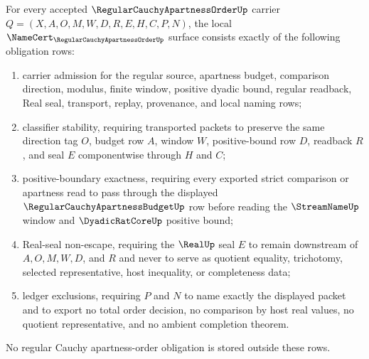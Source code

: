 \begin{theorem}
\label{thm:regular-cauchy-apartness-order-namecert-obligations}
For every accepted $\RegularCauchyApartnessOrderUp$ carrier $Q=(X,A,O,M,W,D,R,E,H,C,P,N)$, the local $\NameCert_{\RegularCauchyApartnessOrderUp}$ surface consists exactly of the following obligation rows:
\begin{enumerate}
\item carrier admission for the regular source, apartness budget, comparison direction, modulus, finite window, positive dyadic bound, regular readback, Real seal, transport, replay, provenance, and local naming rows;
\item classifier stability, requiring transported packets to preserve the same direction tag $O$, budget row $A$, window $W$, positive-bound row $D$, readback $R$, and seal $E$ componentwise through $H$ and $C$;
\item positive-boundary exactness, requiring every exported strict comparison or apartness read to pass through the displayed $\RegularCauchyApartnessBudgetUp$ row before reading the $\StreamNameUp$ window and $\DyadicRatCoreUp$ positive bound;
\item Real-seal non-escape, requiring the $\RealUp$ seal $E$ to remain downstream of $A,O,M,W,D$, and $R$ and never to serve as quotient equality, trichotomy, selected representative, host inequality, or completeness data;
\item ledger exclusions, requiring $P$ and $N$ to name exactly the displayed packet and to export no total order decision, no comparison by host real values, no quotient representative, and no ambient completion theorem.
\end{enumerate}
No regular Cauchy apartness-order obligation is stored outside these rows.
\end{theorem}
